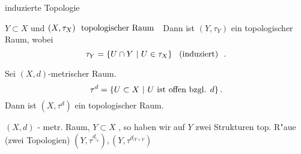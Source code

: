 \documentclass[class=article, crop=false]{standalone}
\begin{document}
\begin{zettel}{induzierte Topologie}
\begin{flashcard}[]{}
	$Y \subset X$ und $(X,\tau_X)  \tx{ topologischer Raum }$
	Dann ist $(Y,\tau_Y)$ ein topologischer Raum, wobei
	\[
		\tau_Y = \set{U \cap Y}{U \in  \tau _X} \tx{ (induziert) }
	.\]
\end{flashcard}

\begin{example}
	Sei $ (X,d) $-metrischer Raum.
	\[
		\tau^d = \set{U \subset X}{U \text{ ist offen bzgl. } d }
	.\]
	Dann ist $(X, \tau^d)$  ein topologischer Raum.
\end{example}

\begin{example}
	$(X,d)$ - metr. Raum, $Y \subset X$ , so haben wir auf $Y$ zwei Strukturen top. R"aue (zwei Topologien) $(Y,\tau^{d_{|_Y}}), (Y, \tau^{d_{|Y \times Y}})$
\end{example}

\end{zettel}
\end{document}
